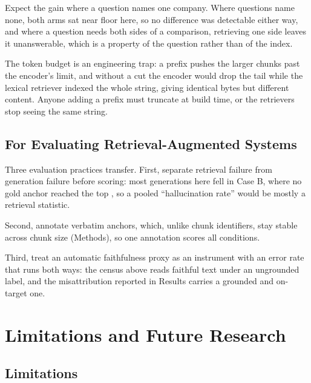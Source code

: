 Expect the gain where a question names one company. Where questions name none,
both arms sat near floor here, so no difference was detectable either way, and
where a question needs both sides of a comparison, retrieving one side leaves it
unanswerable, which is a property of the question rather than of the index.

The token budget is an engineering trap: a prefix pushes the larger chunks past
the encoder's limit, and without a cut the encoder would drop the tail while the
lexical retriever indexed the whole string, giving identical bytes but different
content. Anyone adding a prefix must truncate at build time, or the retrievers
stop seeing the same string.

\subsection{For Evaluating Retrieval-Augmented Systems}

Three evaluation practices transfer. First, separate retrieval failure from
generation failure before scoring: most generations here fell in Case B, where
no gold anchor reached the top \thesisTopK{}, so a pooled ``hallucination rate''
would be mostly a retrieval statistic.

Second, annotate verbatim anchors, which, unlike chunk identifiers, stay stable
across chunk size (Methods), so one annotation scores all
\thesisNumConditions{} conditions.

Third, treat an automatic faithfulness proxy as an instrument with an error
rate that runs both ways: the census above reads faithful text under an
ungrounded label, and the misattribution reported in Results carries a grounded
and on-target one.

\section{Limitations and Future Research}

\subsection{Limitations}

